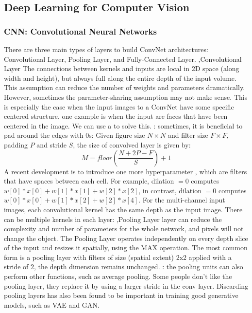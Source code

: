 \documentclass[10pt]{report}
\begin{document}
\subsection{Deep Learning for Computer Vision}

\subsubsection{CNN: Convolutional Neural Networks}
There are three main types of layers to build ConvNet architectures: Convolutional Layer, Pooling Layer, and Fully-Connected Layer.
\sep{Convolutional Layer}
The connections between kernels and inputs are local in 2D space (along width and height), but always full along the entire depth of the input volume. 
This assumption can reduce the number of weights and parameters dramatically. However, sometimes the parameter-sharing assumption may not make sense. This is especially the case when the input images to a ConvNet have some specific centered structure, one example is when the input are faces that have been centered in the image. We can use a  to solve this.
: sometimes, it is beneficial to pad around the edges with 0s:
Given figure size $N\times N$ and filter size $F\times F$, padding $P$ and stride $S$, the size of convolved layer is given by:
\[M=floor(\frac{N+2P-F}{S})+1\]
A recent development is to introduce one more hyperparameter , which are filters that have spaces between each cell. For example, dilation $=0$ computes $w[0]*x[0]+w[1]*x[1]+w[2]*x[2]$, in contrast, dilation $=0$ computes $w[0]*x[0]+w[1]*x[2]+w[2]*x[4]$.
For the multi-channel input images, each convolutional kernel has the same depth as the input image. There can be multiple kernels in each layer:
\sep{Pooling Layer}
 layer can reduce the complexity and number of parameters for the whole network, and  pixels will not change the object. The Pooling Layer operates independently on every depth slice of the input and resizes it spatially, using the MAX operation. The most common form is a pooling layer with filters of size (spatial extent) 2x2 applied with a stride of 2, the depth dimension remains unchanged. 
: the pooling units can also perform other functions, such as average pooling. Some people don't like the pooling layer, they replace it by using a larger stride in the conv layer. Discarding pooling layers has also been found to be important in training good generative models, such as  VAE and GAN.
\end{document}
